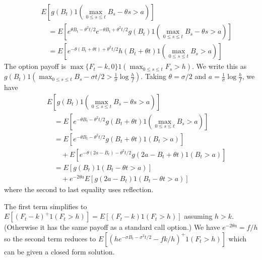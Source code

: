\documentclass[11pt,fleqn]{amsproc}
\begin{document}
\begin{eqnarray*}
&&E[g(B_t) 1(\max_{0\le s\le t}B_s - \theta s > a)]\\
&&\quad =
E[e^{\theta B_t - \theta^2t/2}
e^{-\theta B_t + \theta^2t/2}
g(B_t) 1(\max_{0\le s\le t}B_s - \theta s > a)]\\
&&\quad =
E[e^{-\theta (B_t + \theta t) + \theta^2t/2}
h(B_t + \theta t) 1(\max_{0\le s\le t}B_s > a)]
\end{eqnarray*}
The option payoff is $\max\{F_t - k, 0\} 1(\max_{0\le s\le t} F_s > h)$.
We write this as $g(B_t)
1(\max_{0\le s\le t} B_s - \sigma t/2 > \frac{1}{\sigma}\log \frac{h}{f})$.
Taking $\theta = \sigma/2$ and $a = \frac{1}{\sigma}\log \frac{h}{f}$,
we have
\begin{eqnarray*}
&&E[g(B_t) 1(\max_{0\le s\le t} B_s - \theta s > a)]\\
&&\quad=
E[e^{-\theta B_t - \theta^2 t/2}
g(B_t + \theta t) 1(\max_{0\le s\le t}B_s > a)]\\
&&\quad=
E[e^{-\theta B_t - \theta^2 t/2}
g(B_t + \theta t) 1(B_t > a)]\\
&&\qquad + E[e^{-\theta (2a - B_t) - \theta^2 t/2}
g(2a - B_t + \theta t) 1(B_t > a)]\\
&&\quad=
E[g(B_t) 1(B_t - \theta t > a)]\\
&&\qquad + e^{-2\theta a} E[g(2a - B_t) 1(B_t - \theta t > a)]
\end{eqnarray*}
where the second to last equality uses reflection.

The first term simplifies to $E[(F_t - k)^+1(F_t > h)]
= E[(F_t - k)1(F_t > h)]$ assuming $h > k$. (Otherwise it has the
same payoff as a standard call option.) We have $e^{-2\theta a}
= f/h$ so the second term reduces
to $E[(he^{-\sigma B_t - \sigma^2t/2} - fk/h)^+1(F_t > h)]$
which can be given a closed form solution.
\end{document}
